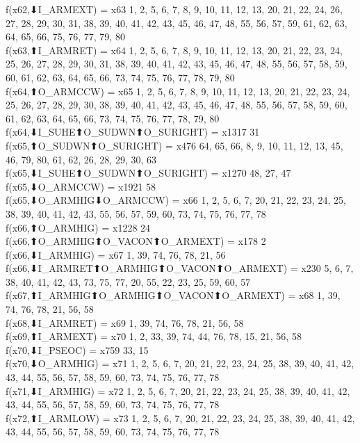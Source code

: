 f(x62,⬇I_ARMEXT) = x63 {1, 2, 5, 6, 7, 8, 9, 10, 11, 12, 13, 20, 21, 22, 24, 26, 27, 28, 29, 30, 31, 38, 39, 40, 41, 42, 43, 45, 46, 47, 48, 55, 56, 57, 59, 61, 62, 63, 64, 65, 66, 75, 76, 77, 79, 80} \\
f(x63,⬆I_ARMRET) = x64 {1, 2, 5, 6, 7, 8, 9, 10, 11, 12, 13, 20, 21, 22, 23, 24, 25, 26, 27, 28, 29, 30, 31, 38, 39, 40, 41, 42, 43, 45, 46, 47, 48, 55, 56, 57, 58, 59, 60, 61, 62, 63, 64, 65, 66, 73, 74, 75, 76, 77, 78, 79, 80} \\
f(x64,⬆O_ARMCCW) = x65 {1, 2, 5, 6, 7, 8, 9, 10, 11, 12, 13, 20, 21, 22, 23, 24, 25, 26, 27, 28, 29, 30, 38, 39, 40, 41, 42, 43, 45, 46, 47, 48, 55, 56, 57, 58, 59, 60, 61, 62, 63, 64, 65, 66, 73, 74, 75, 76, 77, 78, 79, 80} \\
f(x64,⬇I_SUHE⬆O_SUDWN⬆O_SURIGHT) = x1317 {31} \\
f(x65,⬆O_SUDWN⬆O_SURIGHT) = x476 {64, 65, 66, 8, 9, 10, 11, 12, 13, 45, 46, 79, 80, 61, 62, 26, 28, 29, 30, 63} \\
f(x65,⬇I_SUHE⬆O_SUDWN⬆O_SURIGHT) = x1270 {48, 27, 47} \\
f(x65,⬇O_ARMCCW) = x1921 {58} \\
f(x65,⬇O_ARMHIG⬇O_ARMCCW) = x66 {1, 2, 5, 6, 7, 20, 21, 22, 23, 24, 25, 38, 39, 40, 41, 42, 43, 55, 56, 57, 59, 60, 73, 74, 75, 76, 77, 78} \\
f(x66,⬆O_ARMHIG) = x1228 {24} \\
f(x66,⬆O_ARMHIG⬆O_VACON⬆O_ARMEXT) = x178 {2} \\
f(x66,⬇I_ARMHIG) = x67 {1, 39, 74, 76, 78, 21, 56} \\
f(x66,⬇I_ARMRET⬆O_ARMHIG⬆O_VACON⬆O_ARMEXT) = x230 {5, 6, 7, 38, 40, 41, 42, 43, 73, 75, 77, 20, 55, 22, 23, 25, 59, 60, 57} \\
f(x67,⬆I_ARMHIG⬆O_ARMHIG⬆O_VACON⬆O_ARMEXT) = x68 {1, 39, 74, 76, 78, 21, 56, 58} \\
f(x68,⬇I_ARMRET) = x69 {1, 39, 74, 76, 78, 21, 56, 58} \\
f(x69,⬆I_ARMEXT) = x70 {1, 2, 33, 39, 74, 44, 76, 78, 15, 21, 56, 58} \\
f(x70,⬇I_PSEOC) = x759 {33, 15} \\
f(x70,⬇O_ARMHIG) = x71 {1, 2, 5, 6, 7, 20, 21, 22, 23, 24, 25, 38, 39, 40, 41, 42, 43, 44, 55, 56, 57, 58, 59, 60, 73, 74, 75, 76, 77, 78} \\
f(x71,⬇I_ARMHIG) = x72 {1, 2, 5, 6, 7, 20, 21, 22, 23, 24, 25, 38, 39, 40, 41, 42, 43, 44, 55, 56, 57, 58, 59, 60, 73, 74, 75, 76, 77, 78} \\
f(x72,⬆I_ARMLOW) = x73 {1, 2, 5, 6, 7, 20, 21, 22, 23, 24, 25, 38, 39, 40, 41, 42, 43, 44, 55, 56, 57, 58, 59, 60, 73, 74, 75, 76, 77, 78} \\
